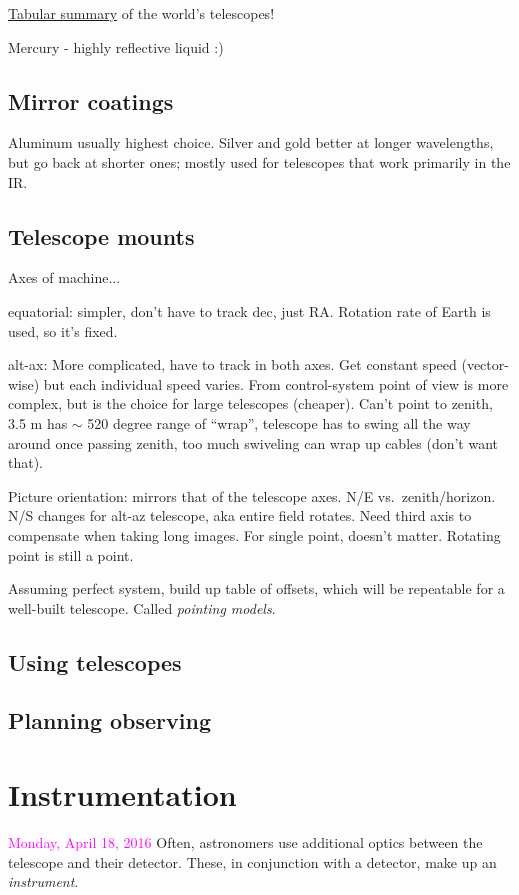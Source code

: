\documentclass[12pt]{article}
\begin{document}
\href{http://astro.nineplanets.org/bigeyes.html}{Tabular summary}
of the world's telescopes!

Mercury - highly reflective liquid :)

\subsection*{Mirror coatings}
Aluminum usually highest choice. Silver and gold better at longer wavelengths,
but go back at shorter ones; mostly used for telescopes that work primarily
in the IR\@.

\subsection*{Telescope mounts}
Axes of machine...
\begin{itemize*}
    \item equatorial: simpler, don't have to track dec, just RA. Rotation rate
        of Earth is used, so it's fixed.
    \item alt-ax: More complicated, have to track in both axes. Get constant speed
        (vector-wise) but each individual speed varies. From control-system point
        of view is more complex, but is the choice for large telescopes
        (cheaper). Can't point to zenith, 3.5 m has $\sim$ 520 degree range
        of ``wrap'', telescope has to swing all the way around once passing
        zenith, too much swiveling can wrap up cables (don't want that).
\end{itemize*}
Picture orientation:  mirrors that of the telescope axes. N/E vs.\ zenith/horizon.
N/S changes for alt-az telescope, aka entire field rotates. Need third axis to
compensate when taking long images. For single point, doesn't matter. Rotating
point is still a point.

Assuming perfect system, build up table of offsets, which will be repeatable
for a well-built telescope. Called \emph{pointing models}.

\subsection*{Using telescopes}
\subsection*{Planning observing}
\section*{Instrumentation}
\textcolor{magenta}{Monday, April 18, 2016}
Often, astronomers use additional optics between the telescope and
their detector. These, in conjunction with a detector, make up an
\emph{instrument}.
\end{document}
